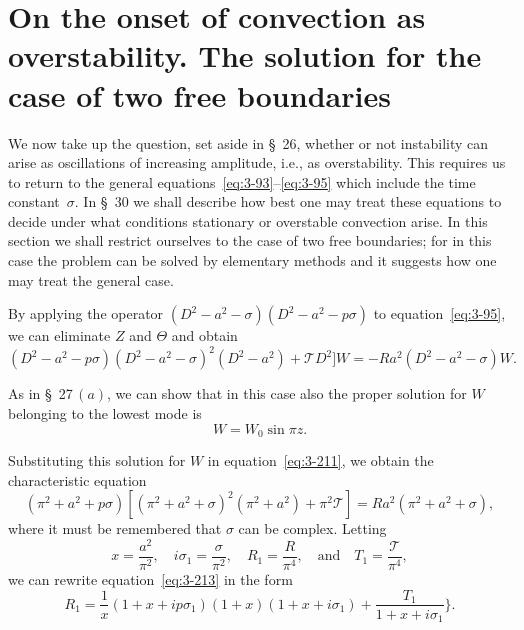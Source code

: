 
\section{On the onset of convection as overstability. The solution for the case of two free boundaries}\label{sec:3-29}

We now take up the question, set aside in \S~26, whether or not instability can arise as oscillations of increasing amplitude, i.e., as overstability. This requires us to return to the general equations~\eqref{eq:3-93}--\eqref{eq:3-95} which include the time constant~$\sigma$. In \S~30 we shall describe how best one may treat these equations to decide under what conditions stationary or overstable convection arise. In this section we shall restrict ourselves to the case of two free boundaries; for in this case the problem can be solved by elementary methods and it suggests how one may treat the general case.

By applying the operator $(D^2 - a^2 - \sigma)(D^2 - a^2 - p\sigma)$ to equation~\eqref{eq:3-95}, we can eliminate $Z$ and $\Theta$ and obtain
\begin{equation}\label{eq:3-211}
(D^2 - a^2 - p\sigma)(D^2 - a^2 - \sigma)^2(D^2 - a^2) + \mathscr{T} D^2] W = -Ra^2(D^2 - a^2 - \sigma)W.
\end{equation}

As in \S~27\,$(a)$, we can show that in this case also the proper solution for $W$ belonging to the lowest mode is
\begin{equation}\label{eq:3-212}
W = W_0 \sin \pi z.
\end{equation}

Substituting this solution for $W$ in equation~\eqref{eq:3-211}, we obtain the characteristic equation
\begin{equation}\label{eq:3-213}
(\pi^2 + a^2 + p\sigma)[(\pi^2 + a^2 + \sigma)^2(\pi^2 + a^2) + \pi^2\mathscr{T}] = Ra^2(\pi^2 + a^2 + \sigma),
\end{equation}
where it must be remembered that $\sigma$ can be complex. Letting
\begin{equation}\label{eq:3-214}
x = \frac{a^2}{\pi^2}, \quad i\sigma_1 = \frac{\sigma}{\pi^2}, \quad R_1 = \frac{R}{\pi^4}, \quad \text{and} \quad T_1 = \frac{\mathscr{T}}{\pi^4},
\end{equation}
we can rewrite equation~\eqref{eq:3-213} in the form
\begin{equation}\label{eq:3-215}
R_1 = \frac{1}{x}(1 + x + ip\sigma_1)(1 + x)(1 + x + i\sigma_1) + \frac{T_1}{1 + x + i\sigma_1}\bigg\}.
\end{equation}

